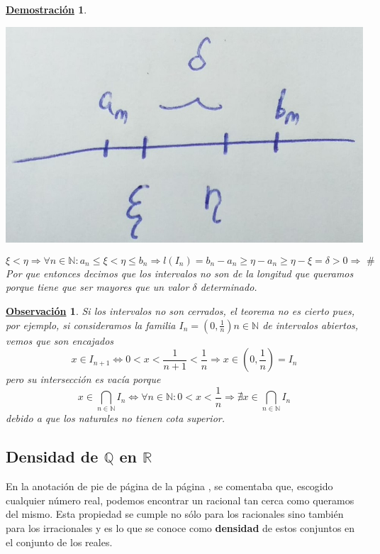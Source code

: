 \documentclass[10pt,a4paper,openright]{book}
\theoremstyle{break}
\newtheorem*{demo}{\underline{Demostración}}
\newtheorem{obs}{\underline{Observación}}[chapter]
\begin{document}
\begin{demo}
\begin{itemize}
\begin{center}
\includegraphics[scale=0.25]{corolario cantor 2}
\end{center}

$$\xi<\eta\Rightarrow \forall n \in \mathbb N: a_n\leq \xi<\eta\leq b_n\Rightarrow l(I_n)=b_n-a_n\geq \eta-a_n\geq \eta-\xi=\delta>0\Rightarrow \mbox{ \#}$$
Por que entonces decimos que los intervalos no son de la longitud que queramos porque tiene que ser mayores que un valor $\delta$ determinado.
\end{itemize}
\end{demo}

\begin{obs}
Si los intervalos no son cerrados, el teorema no es cierto pues, por ejemplo, si consideramos la familia $I_n=\left(0,\frac{1}{n}\right) n\in \mathbb N$ de intervalos abiertos, vemos que son encajados
\[
x\in I_{n+1}\Leftrightarrow 0<x<\frac{1}{n+1}<\frac{1}{n}\Rightarrow x\in \left(0,\frac{1}{n}\right)=I_n
\]
pero su intersección es vacía porque
\[
x\in \bigcap_{n\in \mathbb N}I_n\Leftrightarrow \forall n \in \mathbb N: 0<x<\frac{1}{n}\Rightarrow \nexists x \in \bigcap_{n\in \mathbb{N}} I_n
\]
debido a que los naturales no tienen cota superior.
\end{obs}


\subsection{Densidad de $\mathbb{Q}$ en $\mathbb{R}$}
En la anotación de pie de página de la página \pageref{note: densidad de Q en R}, se comentaba que, escogido cualquier número real, podemos encontrar un racional tan cerca como queramos del mismo. Esta propiedad se cumple no sólo para los racionales sino también para los irracionales y es lo que se conoce como \textbf{densidad} de estos conjuntos en el conjunto de los reales.
\end{document}

